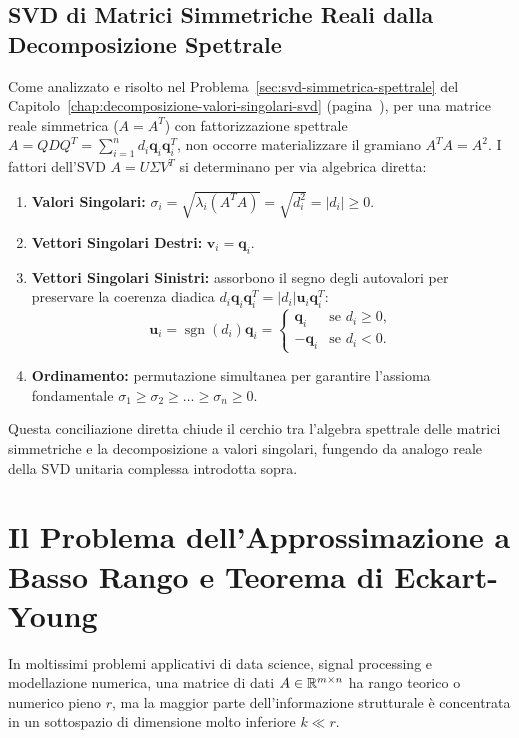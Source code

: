 \subsection{SVD di Matrici Simmetriche Reali dalla Decomposizione Spettrale}
\label{sec:svd-simmetriche-recap}

Come analizzato e risolto nel Problema~\ref{sec:svd-simmetrica-spettrale} del Capitolo~\ref{chap:decomposizione-valori-singolari-svd} (pagina~\pageref{sec:svd-simmetrica-spettrale}), per una matrice reale simmetrica ($A = A^T$) con fattorizzazione spettrale $A = Q D Q^T = \sum_{i=1}^n d_i \mathbf{q}_i \mathbf{q}_i^T$, non occorre materializzare il gramiano $A^T A = A^2$. I fattori dell'SVD $A = U \Sigma V^T$ si determinano per via algebrica diretta:
\begin{enumerate}
    \item \textbf{Valori Singolari:} $\sigma_i = \sqrt{\lambda_i(A^T A)} = \sqrt{d_i^2} = |d_i| \ge 0$.
    \item \textbf{Vettori Singolari Destri:} $\mathbf{v}_i = \mathbf{q}_i$.
    \item \textbf{Vettori Singolari Sinistri:} assorbono il segno degli autovalori per preservare la coerenza diadica $d_i \mathbf{q}_i \mathbf{q}_i^T = |d_i| \mathbf{u}_i \mathbf{q}_i^T$:
    \begin{equation}
        \mathbf{u}_i = \operatorname{sgn}(d_i) \mathbf{q}_i = \begin{cases} \mathbf{q}_i & \text{se } d_i \ge 0, \\ -\mathbf{q}_i & \text{se } d_i < 0. \end{cases}
    \end{equation}
    \item \textbf{Ordinamento:} permutazione simultanea per garantire l'assioma fondamentale $\sigma_1 \ge \sigma_2 \ge \dots \ge \sigma_n \ge 0$.
\end{enumerate}
Questa conciliazione diretta chiude il cerchio tra l'algebra spettrale delle matrici simmetriche e la decomposizione a valori singolari, fungendo da analogo reale della SVD unitaria complessa introdotta sopra.

\FloatBarrier
\section{Il Problema dell'Approssimazione a Basso Rango e Teorema di Eckart-Young}
\label{sec:eckart-young-teorema}

In moltissimi problemi applicativi di data science, signal processing e modellazione numerica, una matrice di dati $A \in \mathbb{R}^{m \times n}$ ha rango teorico o numerico pieno $r$, ma la maggior parte dell'informazione strutturale \`e concentrata in un sottospazio di dimensione molto inferiore $k \ll r$.

